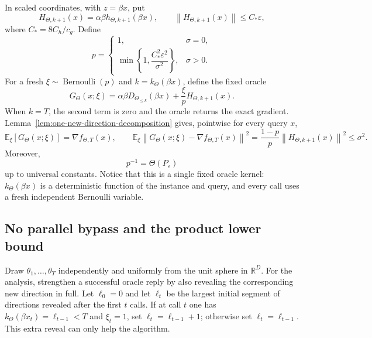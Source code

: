 \documentclass[11pt,a4paper]{article}
\newcommand{\R}{\mathbb{R}}
\newcommand{\E}{\mathbb{E}}
\newcommand{\eps}{\varepsilon}
\newcommand{\norm}[1]{\left\lVert #1\right\rVert}
\theoremstyle{remark}
\begin{document}
In scaled coordinates, with $z=\beta x$, put
\begin{equation}
 H_{\Theta,k+1}(x)=\alpha\beta h_{\Theta,k+1}(\beta x),
 \qquad
 \norm{H_{\Theta,k+1}(x)}\le C_*\eps,
 \label{eq:scaled-rare-vector}
\end{equation}
where $C_*=8C_h/c_g$.  Define
\begin{equation}
 p=
 \begin{cases}
  1,&\sigma=0,\\
  \min\left\{1,\dfrac{C_*^2\eps^2}{\sigma^2}\right\},&\sigma>0.
 \end{cases}
 \label{eq:rare-probability}
\end{equation}
For a fresh $\xi\sim\operatorname{Bernoulli}(p)$ and
$k=k_\Theta(\beta x)$, define the fixed oracle
\begin{equation}
 G_\Theta(x;\xi)
 =\alpha\beta D_{\Theta_{\le k}}(\beta x)
  +\frac{\xi}{p}H_{\Theta,k+1}(x).
 \label{eq:rare-reveal-oracle}
\end{equation}
When $k=T$, the second term is zero and the oracle returns the exact gradient.
Lemma~\ref{lem:one-new-direction-decomposition} gives, pointwise for every
query $x$,
\begin{equation}
 \E_\xi[G_\Theta(x;\xi)]=\nabla f_{\Theta,T}(x),
 \qquad
 \E_\xi\norm{G_\Theta(x;\xi)-\nabla f_{\Theta,T}(x)}^2
 =\frac{1-p}{p}\norm{H_{\Theta,k+1}(x)}^2
 \le\sigma^2.
 \label{eq:rare-oracle-validity}
\end{equation}
Moreover,
\begin{equation}
 p^{-1}=\Theta(P_\eps)
 \label{eq:p-is-P}
\end{equation}
up to universal constants.  Notice that this is a single fixed oracle kernel:
$k_\Theta(\beta x)$ is a deterministic function of the instance and query,
and every call uses a fresh independent Bernoulli variable.

\subsection{No parallel bypass and the product lower bound}

Draw $\theta_1,\ldots,\theta_T$ independently and uniformly from the unit
sphere in $\R^D$.  For the analysis, strengthen a successful oracle reply by
also revealing the corresponding new direction in full.  Let $\ell_0=0$ and
let $\ell_t$ be the largest initial segment of directions revealed after the
first $t$ calls.  If at call $t$ one has
$k_\Theta(\beta x_t)=\ell_{t-1}<T$ and $\xi_t=1$, set
$\ell_t=\ell_{t-1}+1$; otherwise set $\ell_t=\ell_{t-1}$.  This extra reveal
can only help the algorithm.
\end{document}
